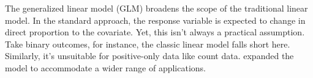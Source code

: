 
The generalized linear model (GLM) broadens the scope of the traditional linear model. In the standard approach, the response variable is expected to change in direct proportion to the covariate. Yet, this isn't always a practical assumption. Take binary outcomes, for instance, the classic linear model falls short here. Similarly, it's unsuitable for positive-only data like count data. \cite{nelder1972generalized} expanded the model to accommodate a wider range of applications.


